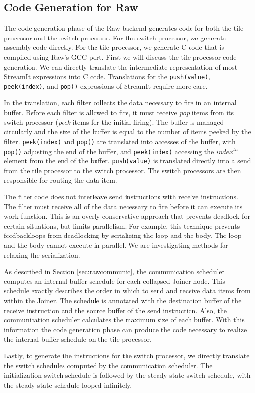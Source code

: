 \subsection{Code Generation for Raw}

The code generation phase of the Raw backend generates code for both
the tile processor and the switch processor.  For the switch
processor, we generate assembly code directly.  For the tile
processor, we generate C code that is compiled using Raw's GCC port.
First we will discuss the tile processor code generation.  We can
directly translate the intermediate representation of most StreamIt
expressions into C code.  Translations for the {\tt push(value)}, {\tt
peek(index)}, and {\tt pop()} expressions of StreamIt require more
care.

In the translation, each filter collects the data necessary to fire in
an internal buffer.  Before each filter is allowed to fire, it must
receive \emph{pop} items from its switch processor (\emph{peek} items
for the initial firing).  The buffer is managed circularly and the
size of the buffer is equal to the number of items peeked by the
filter.  {\tt peek(index)} and {\tt pop()} are translated into
accesses of the buffer, with {\tt pop()} adjusting the end of the
buffer, and {\tt peek(index)} accessing the $index^{th}$ element from
the end of the buffer.  {\tt push(value)} is translated directly into
a send from the tile processor to the switch processor.  The switch
processors are then responsible for routing the data item.

The filter code does not interleave send instructions with receive
instructions.  The filter must receive all of the data necessary to
fire before it can execute its work function.  This is an overly
conservative approach that prevents deadlock for certain situations,
but limits parallelism.  For example, this technique prevents
feedbackloops from deadlocking by serializing the loop and the body.
The loop and the body cannot execute in parallel.  We are
investigating methods for relaxing the serialization.

As described in Section \ref{sec:rawcommunic}, the communication
scheduler computes an internal buffer schedule for each collapsed
Joiner node.  This schedule exactly describes the order in which to
send and receive data items from within the Joiner.  The schedule is
annotated with the destination buffer of the receive instruction and
the source buffer of the send instruction.  Also, the communication
scheduler calculates the maximum size of each buffer.  With this
information the code generation phase can produce the code necessary
to realize the internal buffer schedule on the tile processor.

Lastly, to generate the instructions for the switch processor, we
directly translate the switch schedules computed by the communication
scheduler.  The initialization switch schedule is followed by the steady
state switch schedule, with the steady state schedule looped infinitely.
